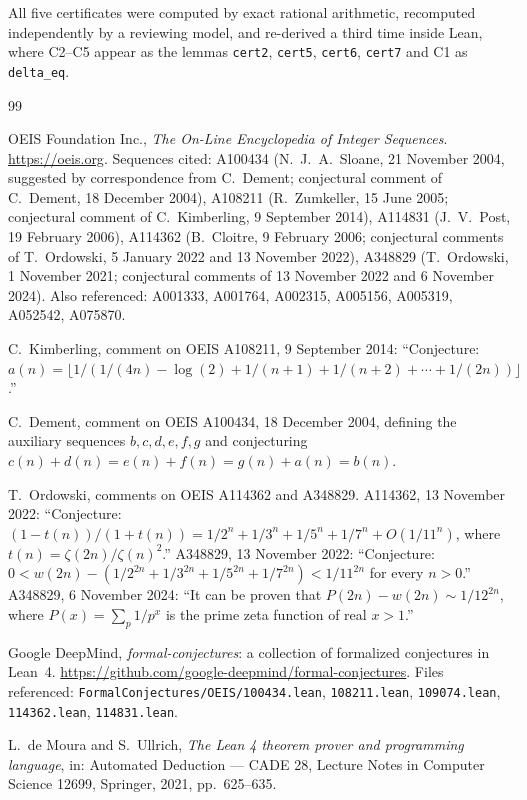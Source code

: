 \documentclass[11pt]{article}
\theoremstyle{plain}
\theoremstyle{definition}
\theoremstyle{remark}
\numberwithin{equation}{section}
\begin{document}
\medskip\noindent
All five certificates were computed by exact rational arithmetic, recomputed independently by a
reviewing model, and re-derived a third time inside Lean, where C2--C5 appear as the lemmas
\texttt{cert2}, \texttt{cert5}, \texttt{cert6}, \texttt{cert7} and C1 as \texttt{delta\_eq}.

\begin{thebibliography}{99}

OEIS Foundation Inc., \emph{The On-Line Encyclopedia of Integer Sequences}.
\url{https://oeis.org}. Sequences cited: A100434 (N.~J.~A.~Sloane, 21 November 2004, suggested by
correspondence from C.~Dement; conjectural comment of C.~Dement, 18 December 2004),
A108211 (R.~Zumkeller, 15 June 2005; conjectural comment of C.~Kimberling, 9 September 2014),
A114831 (J.~V.~Post, 19 February 2006), A114362 (B.~Cloitre, 9 February 2006; conjectural
comments of T.~Ordowski, 5 January 2022 and 13 November 2022), A348829 (T.~Ordowski,
1 November 2021; conjectural comments of 13 November 2022 and 6 November 2024). Also
referenced: A001333, A001764, A002315, A005156, A005319, A052542, A075870.

C.~Kimberling, comment on OEIS A108211, 9 September 2014:
``Conjecture: $a(n) = \lfloor 1/(1/(4n) - \log(2) + 1/(n+1) + 1/(n+2) + \cdots + 1/(2n)) \rfloor$.''

C.~Dement, comment on OEIS A100434, 18 December 2004, defining the auxiliary sequences
$b, c, d, e, f, g$ and conjecturing
$c(n)+d(n) = e(n)+f(n) = g(n)+a(n) = b(n)$.

T.~Ordowski, comments on OEIS A114362 and A348829. A114362, 13 November 2022:
``Conjecture: $(1-t(n))/(1+t(n)) = 1/2^n+1/3^n+1/5^n+1/7^n+O(1/11^n)$, where
$t(n)=\zeta(2n)/\zeta(n)^2$.'' A348829, 13 November 2022: ``Conjecture:
$0 < w(2n) - (1/2^{2n}+1/3^{2n}+1/5^{2n}+1/7^{2n}) < 1/11^{2n}$ for every $n>0$.'' A348829,
6 November 2024: ``It can be proven that $P(2n) - w(2n) \sim 1/12^{2n}$, where
$P(x) = \sum_{p} 1/p^x$ is the prime zeta function of real $x>1$.''

Google DeepMind, \emph{formal-conjectures}: a collection of formalized conjectures in Lean~4.
\url{https://github.com/google-deepmind/formal-conjectures}. Files referenced:
\texttt{FormalConjectures/OEIS/100434.lean}, \texttt{108211.lean}, \texttt{109074.lean},
\texttt{114362.lean}, \texttt{114831.lean}.

L.~de Moura and S.~Ullrich, \emph{The Lean 4 theorem prover and programming language},
in: Automated Deduction --- CADE 28, Lecture Notes in Computer Science 12699, Springer, 2021,
pp.~625--635.


\end{thebibliography}
\end{document}
